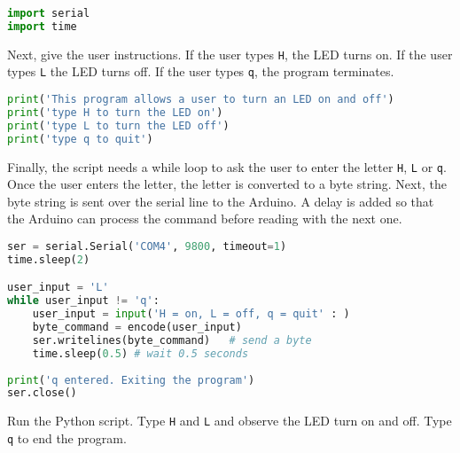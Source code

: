 \documentclass{book}
\newcommand{\passthrough}[1]{#1}
\begin{document}
    
        \begin{lstlisting}[language=Python]
import serial
import time
\end{lstlisting}
    




    
        Next, give the user instructions. If the user types
\passthrough{\lstinline!H!}, the LED turns on. If the user types
\passthrough{\lstinline!L!} the LED turns off. If the user types
\passthrough{\lstinline!q!}, the program terminates.
    




    
        \begin{lstlisting}[language=Python]
print('This program allows a user to turn an LED on and off')
print('type H to turn the LED on')
print('type L to turn the LED off')
print('type q to quit')
\end{lstlisting}
    




    
        Finally, the script needs a while loop to ask the user to enter the
letter \passthrough{\lstinline!H!}, \passthrough{\lstinline!L!} or
\passthrough{\lstinline!q!}. Once the user enters the letter, the letter
is converted to a byte string. Next, the byte string is sent over the
serial line to the Arduino. A delay is added so that the Arduino can
process the command before reading with the next one.
    




    
        \begin{lstlisting}[language=Python]
ser = serial.Serial('COM4', 9800, timeout=1)
time.sleep(2)

user_input = 'L'
while user_input != 'q':
    user_input = input('H = on, L = off, q = quit' : )
    byte_command = encode(user_input)
    ser.writelines(byte_command)   # send a byte
    time.sleep(0.5) # wait 0.5 seconds
        
print('q entered. Exiting the program')
ser.close()
\end{lstlisting}
    




    
        Run the Python script. Type \passthrough{\lstinline!H!} and
\passthrough{\lstinline!L!} and observe the LED turn on and off. Type
\passthrough{\lstinline!q!} to end the program.
    
\end{document}
